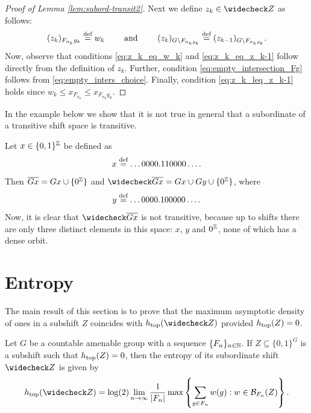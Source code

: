 \begin{proof}[Proof of Lemma \ref{lem:subord-transit2}]
Next we define $z_k\in\subord{Z}$ as follows:
\[
(z_k)_{F_{n_k}g_k} \stackrel{\textup{def}}{=} w_k ~~~~~~\mbox{ and } ~~~~~~ (z_k)_{G\setminus F_{n_kg_k}}\stackrel{\textup{def}}{=}(z_{k-1})_{G\setminus F_{n_kg_k}}.
\]
Now, observe that conditions \eqref{eq:z_k_eq_w_k} and \eqref{eq:z_k_eq_z_k-1} follow directly from the definition of $z_k$. Further, condition \eqref{eq:empty_intersection_Fg} follows from \eqref{eq:empty_inters_choice}. Finally, condition \eqref{eq:z_k_leq_z_k-1} holds since $w_k\leq x_{F_{n_k}}\leq x_{F_{n_k}g_k}$.
\end{proof}

\noindent
In the example below we show that it is not true in general that a subordinate of a transitive shift space is transitive.
\begin{example}
Let $x\in\{0,1\}^{\mathbb{Z}}$ be defined as
\[
x\stackrel{\textup{def}}{=} \ldots 0 0 0 0.11 0 0 0 0 \ldots.
\]
Then $\overline{Gx}=Gx\cup\{0^{\mathbb{Z}}\}$ and  $\subord{\closure{Gx}}=Gx\cup Gy\cup\{0^\Z\}$, where
\[
y\stackrel{\textup{def}}{=} \ldots  0 0 00.10 000 0 \ldots.
\]
Now, it is clear that $\subord{\closure{Gx}}$ is not transitive, because up to shifts there are only three distinct elements in this space: $x$, $y$ and $0^{\mathbb{Z}}$, none of which has a dense orbit.
\end{example}

\section{Entropy} 

The main result of this section is to prove that the maximum asymptotic density of ones in a subshift $Z$ coincides with $\htop(\subord{Z})$ provided $h_\mathrm{top}(Z)=0$.

\begin{thm}\label{thm:entropy-density}
Let $G$ be a countable amenable group with a \Folner sequence $\{F_n\}_{n\in\mathbb{N}}$. If $Z\subseteq\{0,1\}^G$ is a subshift such that $h_\mathrm{top}(Z)=0$, then the entropy of its subordinate shift $\subord{Z}$ is given by 
\[
\htop(\subord{Z})=\log (2)\lim_{n\to\infty}\frac{1}{|F_n|}\max\inbrace{\sum_{g\in F_n} w(g): w\in \mathcal B_{F_n}(Z)}.
\]
\end{thm}

